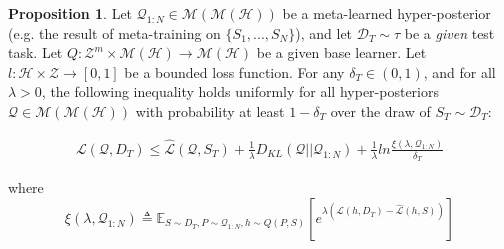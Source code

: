 \documentclass{article}
\theoremstyle{definition}
\newtheorem{proposition}{Proposition}[section]
\newcommand{\Expect}[2]{\mathbb{E}_{#1}\left [#2 \right ]}
\begin{document}
\begin{proposition}
	Let $\mathcal{Q}_{1:N}\in \mathcal{M}(\mathcal{M}(\mathcal{H}))$ be a meta-learned hyper-posterior (e.g. the result of meta-training on $\{S_1,...,S_N\}$), and let $\mathcal{D}_T\sim \tau$ be a \emph{given} test task. Let $Q: \mathcal{Z}^m\times\mathcal{M}(\mathcal{H})\rightarrow \mathcal{M}(\mathcal{H})$ be a given base learner. Let $l: \mathcal{H}\times \mathcal{Z}\rightarrow [0, 1]$ be a bounded loss function.
	For any $\delta_T \in (0,1)$, and for all $\lambda>0$, the following inequality holds uniformly for all hyper-posteriors $\mathcal{Q}\in \mathcal{M}(\mathcal{M}(\mathcal{H}))$ with probability at least $1-\delta_T$ over the draw of $S_T\sim \mathcal{D}_T$:
	
	\begin{align}
	\mathcal{L}(\mathcal{Q}, D_T) \leq \hat{\mathcal{L}}(\mathcal{Q}, S_T) + \frac{1}{\lambda}D_{KL}(\mathcal{Q}||\mathcal{Q}_{1:N})
	+\frac{1}{\lambda}ln\frac{\xi(\lambda,\mathcal{Q}_{1:N})}{\delta_T}
	\end{align}
	
	
	where 
	$$\xi(\lambda,\mathcal{Q}_{1:N})\triangleq \Expect{S\sim D_T, P\sim \mathcal{Q}_{1:N}, h\sim Q(P,S)}{e^{\lambda\left (\mathcal{L}(h, D_T)-\hat{\mathcal{L}}(h, S)\right )}}$$
\end{proposition}
\end{document}
